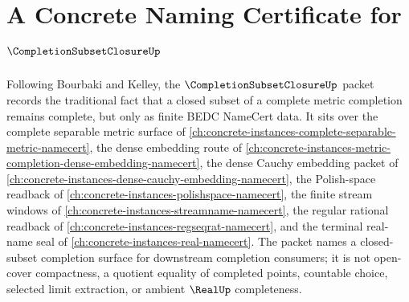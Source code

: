 \chapter{A Concrete Naming Certificate for $\CompletionSubsetClosureUp$}
\label{ch:concrete-instances-completion-subset-closure-namecert}

Following Bourbaki and Kelley, the $\CompletionSubsetClosureUp$ packet records the traditional fact that a closed subset of a complete metric completion remains complete, but only as finite BEDC NameCert data. It sits over the complete separable metric surface of \autoref{ch:concrete-instances-complete-separable-metric-namecert}, the dense embedding route of \autoref{ch:concrete-instances-metric-completion-dense-embedding-namecert}, the dense Cauchy embedding packet of \autoref{ch:concrete-instances-dense-cauchy-embedding-namecert}, the Polish-space readback of \autoref{ch:concrete-instances-polishspace-namecert}, the finite stream windows of \autoref{ch:concrete-instances-streamname-namecert}, the regular rational readback of \autoref{ch:concrete-instances-regseqrat-namecert}, and the terminal real-name seal of \autoref{ch:concrete-instances-real-namecert}. The packet names a closed-subset completion surface for downstream completion consumers; it is not open-cover compactness, a quotient equality of completed points, countable choice, selected limit extraction, or ambient $\RealUp$ completeness.

